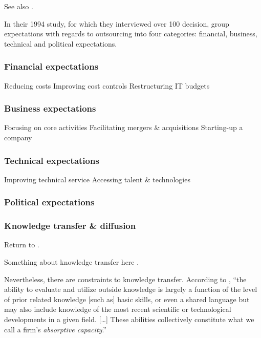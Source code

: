 \documentclass[12pt]{article}
\begin{document}
See also \citep{bessant1995}.

In their 1994 study, for which they interviewed over 100 decision,
\citet[10-17]{lacity1994} group expectations with regards to outsourcing
into four categories: financial, business, technical and political
expectations.

\hypertarget{financial-expectations}{%
\subsubsection{Financial expectations}\label{financial-expectations}}

Reducing costs Improving cost controls Restructuring IT budgets

\hypertarget{business-expectations}{%
\subsubsection{Business expectations}\label{business-expectations}}

Focusing on core activities Facilitating mergers \& acquisitions
Starting-up a company

\hypertarget{technical-expectations}{%
\subsubsection{Technical expectations}\label{technical-expectations}}

Improving technical service Accessing talent \& technologies

\hypertarget{political-expectations}{%
\subsubsection{Political expectations}\label{political-expectations}}

\hypertarget{knowledge-transfer-diffusion}{%
\subsubsection{Knowledge transfer \&
diffusion}\label{knowledge-transfer-diffusion}}

Return to \citet{turner1982}.

Something about knowledge transfer here \citep{sturdy2009}.

Nevertheless, there are constraints to knowledge transfer. According to
\citet[128-129]{cohen1990}, ``the ability to evaluate and utilize
outside knowledge is largely a function of the level of prior related
knowledge {[}such as{]} basic skills, or even a shared language but may
also include knowledge of the most recent scientific or technological
developments in a given field. {[}\ldots{]} These abilities collectively
constitute what we call a firm's \emph{absorptive capacity}.''
\end{document}
